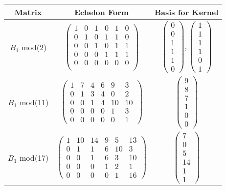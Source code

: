 \documentclass[10pt,a4paper,notitlepage]{article}
\begin{document}
\begin{table}[H]
\centering
\begin{tabular}{|c|c|c|}
\hline
Matrix & Echelon Form & Basis for Kernel\\
\hline
$B_{1}$ mod(2) & $\begin{pmatrix}
1&0&1&0&1&0\\0&1&0&1&1&0\\0&0&1&0&1&1\\0&0&0&1&1&1\\0&0&0&0&0&0\\\end{pmatrix}$&
$\begin{pmatrix}
0\\0\\1\\1\\1\\0\end{pmatrix},\begin{pmatrix}1\\1\\1\\1\\0\\1\end{pmatrix}$\\
\hline
$B_{1}$ mod(11) & $\begin{pmatrix} 1 & 7 & 4 & 6 & 9 & 3\\ 0 & 1 & 3 & 4 & 0 & 2\\ 0 & 0 & 1 & 4 & 10 & 10\\ 0 & 0 & 0 & 0 & 1 & 3\\ 0 & 0 & 0 & 0 & 0 & 1 \end{pmatrix}$&$\begin{pmatrix}
9\\8\\7\\1\\0\\0\end{pmatrix}$\\
\hline
$B_{1}$ mod(17) & $\begin{pmatrix} 1 & 10 & 14 & 9 & 5 & 13\\ 0 & 1 & 1 & 6 & 10 & 3\\ 0 & 0 & 1 & 6 & 3 & 10\\ 0 & 0 & 0 & 1 & 2 & 1\\ 0 & 0 & 0 & 0 & 1 & 16 \end{pmatrix}$&$\begin{pmatrix}
7\\0\\5\\14\\1\\1\end{pmatrix}$\\

\end{tabular}
\end{table}
\end{document}
